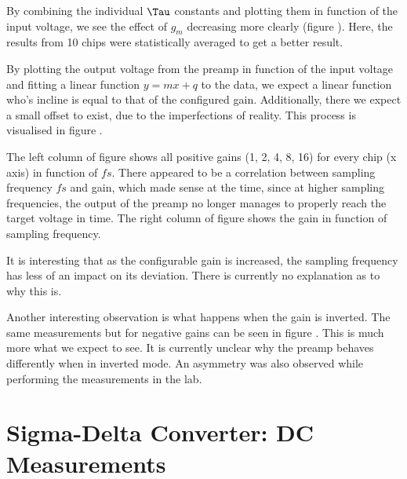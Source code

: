 By combining the individual $\Tau$ constants and  plotting them in function of
the input voltage, we see the  effect of $g_m$ decreasing more clearly (figure
).  Here,  the  results from 10 chips were
statistically averaged to get a better result.


By  plotting  the output voltage from the preamp  in  function  of  the  input
voltage and fitting a linear function $y=mx+q$ to the data, we expect a linear
function who's  incline is equal to that of the configured gain. Additionally,
there  we expect a small offset to exist, due to the imperfections of reality.
This  process  is  visualised  in  figure .

The  left  column of figure   shows  all  positive
gains (1, 2, 4, 8, 16) for every chip (x  axis)  in  function  of  $fs$. There
appeared to be a  correlation  between sampling frequency $fs$ and gain, which
made  sense  at the time, since at higher sampling frequencies, the output  of
the preamp no longer manages to properly reach the target voltage in time. The
right column of figure  shows  the  gain in function
of  sampling  frequency.

It is interesting that as the configurable gain  is  increased,  the  sampling
frequency  has less of an impact on  its  deviation.  There  is  currently  no
explanation as to why this is.

Another interesting observation is what happens when the gain is inverted. The
same   measurements   but  for  negative  gains  can   be   seen   in   figure
. This is  much  more what we expect to see. It is
currently unclear why the preamp behaves differently when in inverted mode. An
asymmetry was also  observed  while  performing  the  measurements in the lab.

\section{Sigma-Delta Converter: DC Measurements}
\label{sec:sigdelDC}



